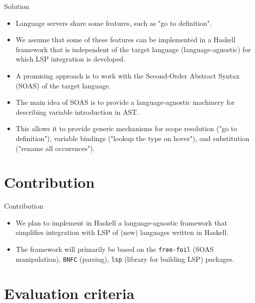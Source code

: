 \documentclass[serif, aspectratio=169]{beamer}
\begin{document}
\begin{frame}{Solution}
    \begin{itemize}
        [<+-| alert+>] %
        \item Language servers share some features, such as "go to definition".
        \item We assume that some of these features can be implemented in a Haskell framework that is independent of the target language (language-agnostic) for which LSP integration is developed.
        \item A promising approach is to work with the Second-Order Abstract Syntax (SOAS) \cite{fiore_formal_2022} of the target language.
        \item The main idea of SOAS is to provide a language-agnostic machinery for describing variable introduction in AST.
        \item This allows it to provide generic mechanisms for scope resolution ("go to definition"), variable bindings ("lookup the type on hover"), and substitution ("rename all occurences").
    \end{itemize}
\end{frame}

\section{Contribution}

\begin{frame}{Contribution}
    \begin{itemize}
        [<+-| alert+>] %
        \item We plan to implement in Haskell a language-agnostic framework that simplifies integration with LSP of (new) languages written in Haskell.
        \item The framework will primarily be based on the \texttt{free-foil} \cite{hackage_free_foil} (SOAS manipulation), \texttt{BNFC} \cite{hackage_bnfc} (parsing), \texttt{lsp} \cite{hackage_lsp} (library for building LSP) packages.
    \end{itemize}
\end{frame}

\section{Evaluation criteria}
\end{document}
